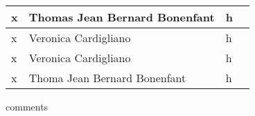 \begin{table}[H]
\begin{tabular}{|l|l|l|l|}
x                & Thomas Jean Bernard Bonenfant & h                                                                                                                                                                                                                                                                               \\ \hline
x                 & Veronica Cardigliano          & h                                                                                                                                                                                                                                                                                     \\ \hline

x              & Veronica Cardigliano          & h                                                                                                                                                                                                                                                                           \\ \hline
x              & Thoma Jean Bernard Bonenfant  & h                                                                                                                                                                                                                                                                                                                                                                                                                                                                                                                                                 \\ \hline
\end{tabular}
\end{table}

{\small comments}